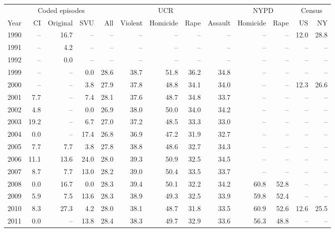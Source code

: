 \begin{center}
\label{tab:c_race}
\small
\setlength{\tabcolsep}{2.5pt}
\renewcommand{\arraystretch}{1.08}
\begin{tabular}{@{}rrrrrrrrrrrrr@{}}
\toprule
 & \multicolumn{3}{c}{Coded episodes} & \multicolumn{5}{c}{UCR} & \multicolumn{2}{c}{NYPD} & \multicolumn{2}{c}{Census} \\
\cmidrule(lr){2-4}
\cmidrule(lr){5-9}
\cmidrule(lr){10-11}
\cmidrule(lr){12-13}
Year & CI & Original & SVU & All & Violent & Homicide & Rape & Assault & Homicide & Rape & US & NY \\
\midrule
1990 & -- & 16.7 & -- & -- & -- & -- & -- & -- & -- & -- & 12.0 & 28.8 \\
1991 & -- & 4.2 & -- & -- & -- & -- & -- & -- & -- & -- & -- & -- \\
1992 & -- & 0.0 & -- & -- & -- & -- & -- & -- & -- & -- & -- & -- \\
1999 & -- & -- & 0.0 & 28.6 & 38.7 & 51.8 & 36.2 & 34.8 & -- & -- & -- & -- \\
2000 & -- & -- & 3.8 & 27.9 & 37.8 & 48.8 & 34.1 & 34.0 & -- & -- & 12.3 & 26.6 \\
2001 & 7.7 & -- & 7.4 & 28.1 & 37.6 & 48.7 & 34.8 & 33.7 & -- & -- & -- & -- \\
2002 & 4.8 & -- & 0.0 & 26.9 & 38.0 & 50.0 & 34.0 & 34.2 & -- & -- & -- & -- \\
2003 & 19.2 & -- & 6.7 & 27.0 & 37.2 & 48.5 & 33.3 & 33.0 & -- & -- & -- & -- \\
2004 & 0.0 & -- & 17.4 & 26.8 & 36.9 & 47.2 & 31.9 & 32.7 & -- & -- & -- & -- \\
2005 & 7.7 & 7.7 & 3.8 & 27.8 & 38.8 & 48.6 & 32.7 & 34.3 & -- & -- & -- & -- \\
2006 & 11.1 & 13.6 & 24.0 & 28.0 & 39.3 & 50.9 & 32.5 & 34.5 & -- & -- & -- & -- \\
2007 & 8.7 & 7.7 & 13.0 & 28.2 & 39.0 & 50.4 & 33.5 & 33.7 & -- & -- & -- & -- \\
2008 & 0.0 & 16.7 & 0.0 & 28.3 & 39.4 & 50.1 & 32.2 & 34.2 & 60.8 & 52.8 & -- & -- \\
2009 & 5.9 & 7.5 & 13.6 & 28.3 & 38.9 & 49.3 & 32.5 & 33.9 & 59.8 & 52.4 & -- & -- \\
2010 & 8.3 & 27.3 & 4.2 & 28.0 & 38.1 & 48.7 & 31.8 & 33.5 & 60.9 & 52.6 & 12.6 & 25.5 \\
2011 & 0.0 & -- & 13.8 & 28.4 & 38.3 & 49.7 & 32.9 & 33.6 & 56.3 & 48.8 & -- & -- \\

\end{tabular}
\end{center}

